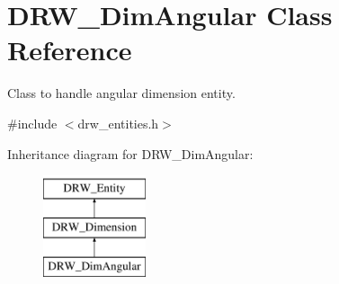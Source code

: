\hypertarget{classDRW__DimAngular}{\section{D\-R\-W\-\_\-\-Dim\-Angular Class Reference}
\label{classDRW__DimAngular}
}


Class to handle angular dimension entity.  




{\ttfamily \#include $<$drw\-\_\-entities.\-h$>$}

Inheritance diagram for D\-R\-W\-\_\-\-Dim\-Angular\-:\begin{figure}[H]
\begin{center}
\leavevmode
\includegraphics[height=3.000000cm]{classDRW__DimAngular}
\end{center}
\end{figure}
